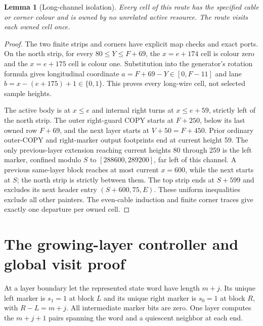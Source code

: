 \documentclass[11pt,letterpaper]{article}
\newtheorem{lemma}[theorem]{Lemma}
\theoremstyle{definition}\newtheorem{definition}[theorem]{Definition}
\theoremstyle{remark}\newtheorem{remark}[theorem]{Remark}
\begin{document}
\begin{lemma}[Long-channel isolation]\label{ptr:la:lem:channel}
Every cell of this route has the specified cable or corner colour and is owned by no unrelated active resource. The route visits each owned cell once.
\end{lemma}
\begin{proof}
The two finite strips and corners have explicit map checks and exact ports. On the north strip, for every $80\le Y\le F+69$, the $x=e+174$ cell is colour zero and the $x=e+175$ cell is colour one. Substitution into the generator's rotation formula gives longitudinal coordinate $a=F+69-Y\in[0,F-11]$ and lane $b=x-(e+175)+1\in\{0,1\}$. This proves every long-wire cell, not selected sample heights.

The active body is at $x\le e$ and internal right turns at $x\le e+59$, strictly left of the north strip. The outer right-guard COPY starts at $F+250$, below its last owned row $F+69$, and the next layer starts at $V+50=F+450$. Prior ordinary outer-COPY and right-marker output footprints end at current height 59. The only previous-layer extension reaching current heights 80 through 259 is the left marker, confined modulo $S$ to $[288600,289200]$, far left of this channel. A previous same-layer block reaches at most current $x=600$, while the next starts at $S$; the north strip is strictly between them. The top strip ends at $S+599$ and excludes its next header entry $(S+600,75,E)$. These uniform inequalities exclude all other painters. The even-cable induction and finite corner traces give exactly one departure per owned cell.
\end{proof}

\section{The growing-layer controller and global visit proof}\label{ptr:la:sec:global}
At a layer boundary let the represented state word have length $m+j$. Its unique left marker is $s_1=1$ at block $L$ and its unique right marker is $s_0=1$ at block $R$, with $R-L=m+j$. All intermediate marker bits are zero. One layer computes the $m+j+1$ pairs spanning the word and a quiescent neighbor at each end.
\end{document}
